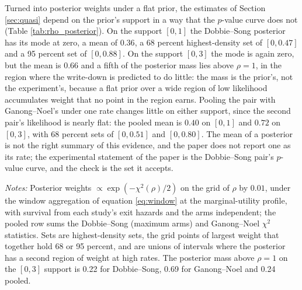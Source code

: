 Turned into posterior weights under a flat prior, the estimates of Section \ref{sec:quasi} depend on the prior's support in a way that the $p$-value curve does not (Table \ref{tab:rho_posterior}). On the support $[0, 1]$ the Dobbie--Song posterior has its mode at zero, a mean of $0.36$, a 68 percent highest-density set of $[0, 0.47]$ and a 95 percent set of $[0, 0.88]$. On the support $[0, 3]$ the mode is again zero, but the mean is $0.66$ and a fifth of the posterior mass lies above $\rho = 1$, in the region where the write-down is predicted to do little: the mass is the prior's, not the experiment's, because a flat prior over a wide region of low likelihood accumulates weight that no point in the region earns. Pooling the pair with Ganong--Noel's under one rate changes little on either support, since the second pair's likelihood is nearly flat: the pooled mean is $0.40$ on $[0, 1]$ and $0.72$ on $[0, 3]$, with 68 percent sets of $[0, 0.51]$ and $[0, 0.80]$. The mean of a posterior is not the right summary of this evidence, and the paper does not report one as its rate; the experimental statement of the paper is the Dobbie--Song pair's $p$-value curve, and the check is the set it accepts.

\begin{table}[H]
\centering
\caption{Posterior summaries of the rate under a flat prior, by pair and support}
\label{tab:rho_posterior}
\small

\vspace{0.5em}
\begin{minipage}{0.95\textwidth}
\small \textit{Notes:} Posterior weights $\propto \exp(-\chi^2(\rho)/2)$ on the grid of $\rho$ by $0.01$, under the window aggregation of equation \eqref{eq:window} at the marginal-utility profile, with survival from each study's exit hazards and the arms independent; the pooled row sums the Dobbie--Song (maximum arms) and Ganong--Noel $\chi^2$ statistics. Sets are highest-density sets, the grid points of largest weight that together hold 68 or 95 percent, and are unions of intervals where the posterior has a second region of weight at high rates. The posterior mass above $\rho = 1$ on the $[0, 3]$ support is 0.22 for Dobbie--Song, 0.69 for Ganong--Noel and 0.24 pooled.
\end{minipage}
\end{table}

